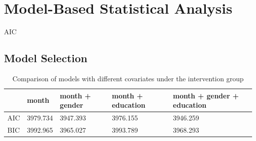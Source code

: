 \section{Model-Based Statistical Analysis} \label{sec:confirmatory}

AIC \cite{wu2009mixed}

\subsection{Model Selection}

\begin{table}[H]
\centering
\begin{tabular}{|l|l|l|l|l|}
\hline
& month & month + gender & month + education & month + gender + education \\
\hline
AIC & 3979.734 & 3947.393 & 3976.155 & 3946.259 \\
\hline
BIC & 3992.965 & 3965.027 & 3993.789 & 3968.293\\
\hline
\end{tabular}
\caption{Comparison of models with different covariates under the intervention group}
\label{tab:model.comp.intervention}
\end{table}

